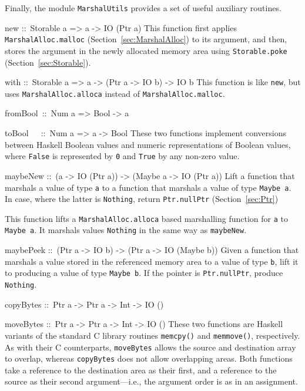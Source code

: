 \documentclass[a4paper,twoside]{article}
\makeatletter
\newcommand{\code}[1]{\texttt{#1}}      %
\newenvironment{codedesc}{%
  \list{}{\labelwidth\z@
    \let\makelabel\codedesclabel}
  }{%
  \endlist
  }
\newcommand*{\codedesclabel}[1]{%
  \hspace{-\leftmargin}
  \parbox[b]{\labelwidth}{\makebox[0pt][l]{\code{#1}}\\}\hfil\relax
  }
\newcommand{\combineitems}{\vspace*{-\itemsep}\vspace*{-\parsep}\vspace*{-1em}}
\makeatother
\begin{document}
Finally, the module \code{MarshalUtils} provides a set of useful auxiliary
routines. 
%
\begin{codedesc}
\item[new ::\ Storable a => a -> IO (Ptr a)] This function first applies
  \code{MarshalAlloc.malloc} (Section~\ref{sec:MarshalAlloc}) to its
  argument, and then, stores the argument in the newly allocated memory area
  using \code{Storable.poke} (Section~\ref{sec:Storable}).
  
\item[with ::\ Storable a => a -> (Ptr a -> IO b) -> IO b] This function is
  like \code{new}, but uses \code{MarshalAlloc.alloca} instead of
  \code{MarshalAlloc.malloc}.

\item[fromBool~::\ Num a => Bool -> a]
\item[toBool~~~::\ Num a => a -> Bool]\combineitems These two functions
  implement conversions between Haskell Boolean values and numeric
  representations of Boolean values, where \code{False} is represented by
  \code{0} and \code{True} by any non-zero value.

\item[maybeNew ::\ (a -> IO (Ptr a)) -> (Maybe a -> IO (Ptr a))]
  Lift a function that marshals a value of type \code{a} to a function that
  marshals a value of type \code{Maybe a}.  In case, where the latter is
  \code{Nothing}, return \code{Ptr.nullPtr} (Section~\ref{sec:Ptr})

\item[maybeWith ::\ (a -> (Ptr b -> IO c) -> IO c)%
  -> (Maybe a -> (Ptr b -> IO c) -> IO c)] This function lifts a
  \code{MarshalAlloc.alloca} based marshalling function for \code{a} to
  \code{Maybe a}.  It marshals values \code{Nothing} in the same way as
  \code{maybeNew}. 
  
\item[maybePeek ::\ (Ptr a -> IO b) -> (Ptr a -> IO (Maybe b))] Given a
  function that marshals a value stored in the referenced memory area to a
  value of type \code{b}, lift it to producing a value of type \code{Maybe b}.
  If the pointer is \code{Ptr.nullPtr}, produce \code{Nothing}.
  

\item[copyBytes ::\ Ptr a -> Ptr a -> Int -> IO ()]
\item[moveBytes ::\ Ptr a -> Ptr a -> Int -> IO ()]\combineitems These two
  functions are Haskell variants of the standard C library routines
  \code{memcpy()} and \code{memmove()}, respectively.  As with their C
  counterparts, \code{moveBytes} allows the source and destination array to
  overlap, whereas \code{copyBytes} does not allow overlapping areas.  Both
  functions take a reference to the destination area as their first, and a
  reference to the source as their second argument---i.e., the argument order
  is as in an assignment.
\end{codedesc}
\end{document}

